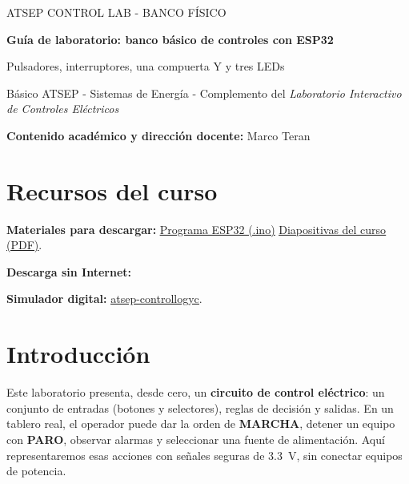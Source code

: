 \documentclass[11pt,a4paper]{article}
\begin{document}
\thispagestyle{empty}

{\color{azul}\ttfamily\small ATSEP CONTROL LAB - BANCO FÍSICO}\par\vspace{4pt}
{\LARGE\bfseries\color{navy} Guía de laboratorio: banco básico de controles con ESP32\par}\vspace{4pt}
{\large\color{pizarra} Pulsadores, interruptores, una compuerta Y y tres LEDs\par}\vspace{6pt}
{\small Básico ATSEP - Sistemas de Energía - Complemento del \emph{Laboratorio Interactivo de Controles Eléctricos}\par
\textbf{Contenido académico y dirección docente:} Marco Teran}

\section*{Recursos del curso}
\noindent\textbf{Materiales para descargar:}
\href{https://github.com/marcoteran/atsep-energy-control-labs/raw/refs/heads/master/firmware/banco_simple_esp32.ino}{\textcolor{azul}{\underline{Programa ESP32 (.ino)}}}
\quad
\href{https://github.com/marcoteran/atsep-energy-control-labs/raw/refs/heads/master/presentaciones/marcoteran_energy_electriccontroland_wiredlogyc.pdf}{\textcolor{azul}{\underline{Diapositivas del curso (PDF)}}}.
\par
\noindent\textbf{Descarga sin Internet:} \par
\noindent\textbf{Simulador digital:} \href{https://github.com/marcoteran/atsep-controllogyc}{\textcolor{azul}{\underline{atsep-controllogyc}}}.\par
\vspace{4pt}

\section*{Introducción}

Este laboratorio presenta, desde cero, un \textbf{circuito de control eléctrico}: un conjunto de entradas (botones y selectores), reglas de decisión y salidas. En un tablero real, el operador puede dar la orden de \textbf{MARCHA}, detener un equipo con \textbf{PARO}, observar alarmas y seleccionar una fuente de alimentación. Aquí representaremos esas acciones con señales seguras de \SI{3,3}{V}, sin conectar equipos de potencia.
\end{document}
